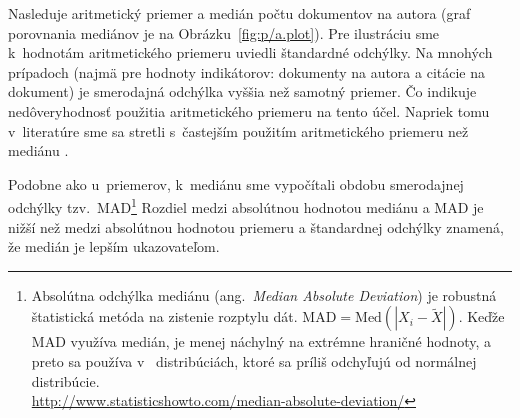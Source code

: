 Nasleduje aritmetický priemer a medián počtu dokumentov na autora (graf
porovnania mediánov je na Obrázku~\ref{fig:p/a.plot}).  Pre ilustráciu sme
k~hodnotám aritmetického priemeru uviedli štandardné odchýlky.  Na mnohých
prípadoch (najmä pre hodnoty indikátorov: dokumenty na autora a citácie na
dokument) je smerodajná odchýlka vyššia než samotný priemer.  Čo indikuje
nedôveryhodnosť použitia aritmetického priemeru na tento účel.  Napriek tomu
v~literatúre sme sa stretli s~častejším použitím aritmetického priemeru než
mediánu \citep{Lazaridis2010}.

Podobne ako u~priemerov, k~mediánu sme vypočítali obdobu smerodajnej odchýlky
tzv.~MAD\footnote{Absolútna odchýlka mediánu (ang.~\emph{Median Absolute
    Deviation}) je robustná štatistická metóda na zistenie rozptylu dát.
  $\mathrm{MAD} = \mathrm{Med}(|X_i - \tilde{X}|)$.  Keďže MAD využíva medián,
  je menej náchylný na extrémne hraničné hodnoty, a preto sa používa v~
  distribúciách, ktoré sa príliš odchyľujú od normálnej
  distribúcie.\\\url{http://www.statisticshowto.com/median-absolute-deviation/}}
Rozdiel medzi absolútnou hodnotou mediánu a MAD je nižší než medzi absolútnou
hodnotou priemeru a štandardnej odchýlky znamená, že medián je lepším
ukazovateľom.

